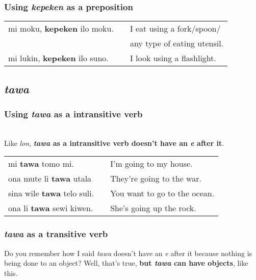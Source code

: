 \subsubsection*{Using \textit{kepeken} as a preposition}
%
\begin{supertabular}{p{5,5cm}|ll}
mi moku, \textbf{kepeken} ilo moku. && I eat using a fork/spoon/ \\ && any type of eating utensil. \\
mi lukin, \textbf{kepeken} ilo suno. && I look using a flashlight.  \\
\end{supertabular} 

\subsection*{\textit{tawa}}
%
\subsubsection*{Using \textit{tawa} as a intransitive verb} \\
%
Like \textit{lon}, \textbf{\textit{tawa} as a intransitive verb doesn't have an \textit{e} after it}. \\

\begin{supertabular}{p{5,5cm}|ll}
mi \textbf{tawa} tomo mi. && I'm going to my house. \\
ona mute li \textbf{tawa} utala && They're going to the war. \\
sina wile \textbf{tawa} telo suli. && You want to go to the ocean. \\
ona li \textbf{tawa} sewi kiwen. && She's going up the rock. \\
\end{supertabular} 

\subsubsection*{\textit{tawa} as a transitive verb}
%
Do you remember how I said \textit{tawa} doesn't have an \textit{e} after it because nothing is being done to an object? 
Well, that's true, \textbf{but \textit{tawa} can have objects}, like this.

